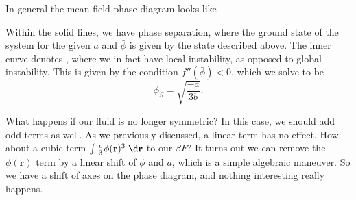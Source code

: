 \documentclass[a4paper]{article}
\begin{document}
In general the mean-field phase diagram looks like
\begin{center}
\end{center}
Within the solid lines, we have phase separation, where the ground state of the system for the given $a$ and $\bar{\phi}$ is given by the state described above. The inner curve denotes , where we in fact have local instability, as opposed to global instability. This is given by the condition $f''(\bar{\phi}) < 0$, which we solve to be
\[
  \phi_S = \sqrt{\frac{-a}{3b}}.
\]

What happens if our fluid is no longer symmetric? In this case, we should add odd terms as well. As we previously discussed, a linear term has no effect. How about a cubic term $\int \frac{c}{3} \phi(\mathbf{r})^3 \;\d \mathbf{r}$ to our $\beta F$? It turns out we can remove the $\phi(\mathbf{r})$ term by a linear shift of $\phi$ and $a$, which is a simple algebraic maneuver. So we have a shift of axes on the phase diagram, and nothing interesting really happens.
\end{document}
